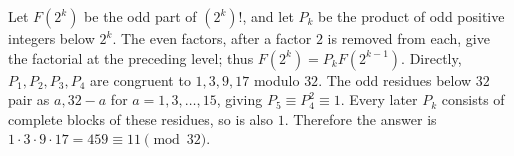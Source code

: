 Let $F(2^k)$ be the odd part of $(2^k)!$, and let $P_k$ be the product of odd positive integers below $2^k$. The even factors, after a factor $2$ is removed from each, give the factorial at the preceding level; thus $F(2^k)=P_kF(2^{k-1})$. Directly, $P_1,P_2,P_3,P_4$ are congruent to $1,3,9,17$ modulo $32$. The odd residues below $32$ pair as $a,32-a$ for $a=1,3,\ldots,15$, giving $P_5\equiv P_4^2\equiv1$. Every later $P_k$ consists of complete blocks of these residues, so is also $1$. Therefore the answer is $1\cdot3\cdot9\cdot17=459\equiv\boxed{11}\pmod{32}$.
